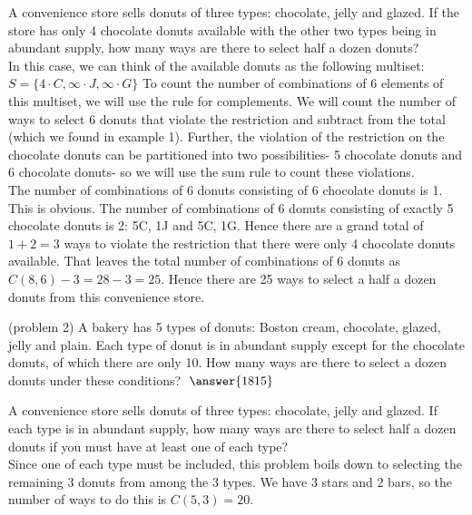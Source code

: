 \documentclass[handout]{ximera}
\begin{document}
 

\begin{example}[example 2]
A convenience store sells donuts of three types: chocolate, jelly and glazed.  If the store has only 4 chocolate donuts available with the other two types being in abundant supply, how many ways are there to select half a dozen donuts?\\
In this case, we can think of the available donuts as the following multiset: 
$S = \{4\cdot C, \infty \cdot J, \infty \cdot G\}$ To count the number of combinations of 6 elements of this multiset, we will use the rule for complements. We will count the number of ways to select 6 donuts that violate the restriction and subtract from the total (which we found in example 1).  Further, the violation of the restriction on the chocolate donuts can be partitioned into two possibilities- 5 chocolate donuts and 6 chocolate donuts- so we will use the sum rule to count these violations.\\
The number of combinations of 6 donuts consisting of 6 chocolate donuts is 1. This is obvious.  The number of combinations of 6 donuts consisting of exactly 5 chocolate donuts is 2: 5C, 1J and 5C, 1G.  Hence there are a grand total of $1+2 =3$
ways to violate the restriction that there were only 4 chocolate donuts available.  That leaves the total number of combinations of 6 donuts as $C(8,6) -3 = 28 - 3 = 25$.
Hence there are 25 ways to select a half a dozen donuts from this convenience store.
\end{example}


\begin{problem}(problem 2)
A bakery has 5 types of donuts: Boston cream, chocolate, glazed, jelly and plain.
Each type of donut is in abundant supply except for the chocolate donuts, of which there are only 10. 
How many ways are there to select a dozen donuts under these conditions? $\; \answer{1815}$
\end{problem}


\begin{example}[example 3]
A convenience store sells donuts of three types: chocolate, jelly and glazed.  
If each type is in abundant supply, how many ways are there to select half a 
dozen donuts if you must have at least one of each type?\\
Since one of each type must be included, this problem boils down to selecting the 
remaining 3 donuts from among the 3 types. We have 3 stars and 2 bars, so
the number of ways to do this is $C(5, 3) = 20$.
\end{example}
\end{document}
